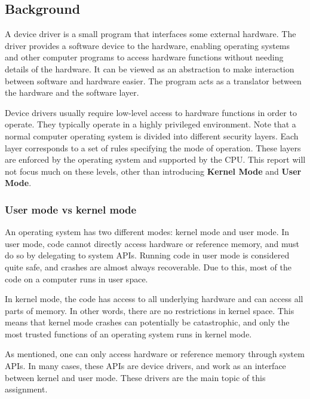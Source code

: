 \subsection{Background}
A device driver is a small program that interfaces some external hardware. The driver provides a software device to the hardware, enabling operating systems and other computer programs to access hardware functions without needing details of the hardware. It can be viewed as an abstraction to make interaction between software and hardware easier. The program acts as a translator between the hardware and the software layer. 

Device drivers usually require low-level access to hardware functions in order to operate. They typically operate in a highly privileged environment. Note that a normal computer operating system is divided into different security layers. Each layer corresponds to a set of rules specifying the mode of operation. These layers are enforced by the operating system and supported by the CPU. This report will not focus much on these levels, other than introducing {\bf Kernel Mode} and {\bf User Mode}. 

\subsubsection{User mode vs kernel mode}
An operating system has two different modes: kernel mode and user mode. In user mode, code cannot directly access hardware or reference memory, and must do so by delegating to system APIs. Running code in user mode is considered quite safe, and crashes are almost always recoverable. Due to this, most of the code on a computer runs in user space. 

In kernel mode, the code has access to all underlying hardware and can access all parts of memory. In other words, there are no restrictions in kernel space. This means that kernel mode crashes can potentially be catastrophic, and only the most trusted functions of an operating system runs in kernel mode. 

As mentioned, one can only access hardware or reference memory through system APIs. In many cases, these APIs are device drivers, and work as an interface between kernel and user mode. These drivers are the main topic of this assignment.



